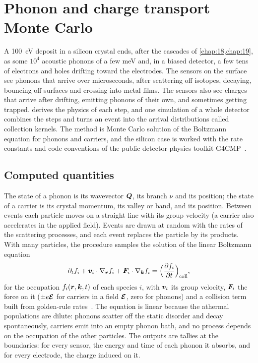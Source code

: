 \section{Phonon and charge transport Monte Carlo}\label{app:E.12}

A \SI{100}{eV} deposit in a silicon crystal ends, after the cascades of \cref{chap:18,chap:19}, as some $10^4$ acoustic phonons of a few meV and, in a biased detector, a few tens of electrons and holes drifting toward the electrodes. The sensors on the surface see phonons that arrive over microseconds, after scattering off isotopes, decaying, bouncing off surfaces and crossing into metal films. The sensors also see charges that arrive after drifting, emitting phonons of their own, and sometimes getting trapped.  derives the physics of each step, and one simulation of a whole detector combines the steps and turns an event into the arrival distributions called collection kernels. The method is Monte Carlo solution of the Boltzmann equation for phonons and carriers, and the silicon case is worked with the rate constants and code conventions of the public detector-physics toolkit G4CMP~\cite{kelsey2023g4cmp,leman2012invited}.

\subsection{Computed quantities}

The state of a phonon is its wavevector $\bm{Q}$, its branch $\nu$ and its position; the state of a carrier is its crystal momentum, its valley or band, and its position. Between events each particle moves on a straight line with its group velocity (a carrier also accelerates in the applied field). Events are drawn at random with the rates of the scattering processes, and each event replaces the particle by its products. With many particles, the procedure samples the solution of the linear Boltzmann equation
\begin{equation}
  \partial_t f_i + \bm{v}_i\cdot\nabla_{\bm{r}} f_i + \bm{F}_i\cdot\nabla_{\bm{k}} f_i = \Bigl(\frac{\partial f_i}{\partial t}\Bigr)_{\mathrm{coll}},
  \label{eq:E.12-boltzmann}
\end{equation}
for the occupation $f_i(\bm{r}, \bm{k}, t)$ of each species $i$, with $\bm{v}_i$ its group velocity, $\bm{F}_i$ the force on it ($\pm e\bm{\mathcal{E}}$ for carriers in a field $\bm{\mathcal{E}}$, zero for phonons) and a collision term built from golden-rule rates~\cite{jacoboni1983monte}. The equation is linear because the athermal populations are dilute: phonons scatter off the static disorder and decay spontaneously, carriers emit into an empty phonon bath, and no process depends on the occupation of the other particles. The outputs are tallies at the boundaries: for every sensor, the energy and time of each phonon it absorbs, and for every electrode, the charge induced on it.

